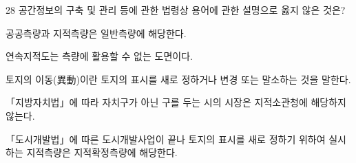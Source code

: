 \begin{question}{28}
공간정보의 구축 및 관리 등에 관한 법령상 용어에 관한 설명으로 옳지 않은 것은?
\begin{choices}
  \item 공공측량과 지적측량은 일반측량에 해당한다.
  \item 연속지적도는 측량에 활용할 수 없는 도면이다.
  \item 토지의 이동(異動)이란 토지의 표시를 새로 정하거나 변경 또는 말소하는 것을 말한다.
  \item 「지방자치법」에 따라 자치구가 아닌 구를 두는 시의 시장은 지적소관청에 해당하지 않는다.
  \item 「도시개발법」에 따른 도시개발사업이 끝나 토지의 표시를 새로 정하기 위하여 실시하는 지적측량은 지적확정측량에 해당한다.
\end{choices}
\end{question}
